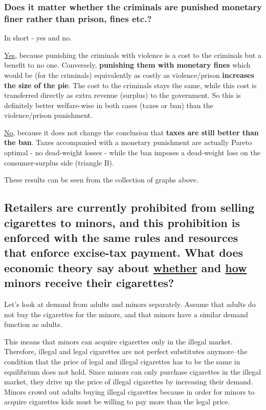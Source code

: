 \documentclass{article}
\begin{document}
\subsubsection{Does it matter whether the criminals are punished
  monetary finer rather than prison, fines etc.?}

In short - yes and no.

\underline{Yes}, because punishing the criminals with violence is a
cost to the criminals but a benefit to no one. Conversely,
\textbf{punishing them with monetary fines} which would be (for the
criminals) equivalently as costly as violence/prison \textbf{increases
  the size of the pie}. The cost to the criminals stays the same,
while this cost is transferred directly as extra revenue (surplus) to
the government. So this is definitely better welfare-wise in both
cases (taxes or ban) than the violence/prison punishment.

\underline{No}, because it does not change the conclusion that
\textbf{taxes are still better than the ban}. Taxes accompanied with a
monetary punishment are actually Pareto optimal - no dead-weight losses
- while the ban imposes a dead-weight loss on the consumer-surplus side
(triangle B).

These results can be seen from the collection of graphs above.



\subsection{Retailers are currently prohibited from selling cigarettes
  to minors, and this prohibition is enforced with the same rules and
  resources that enforce excise-tax payment. What does economic theory
  say about \underline{whether} and \underline{how} minors receive
  their cigarettes?}

Let's look at demand from adults and minors separately. Assume that
adults do not buy the cigarettes for the minors, and that minors have
a similar demand function as adults.

This means that minors can acquire cigarettes only in the illegal
market. Therefore, illegal and legal cigarettes are not perfect
substitutes anymore--the condition that the price of legal and illegal
cigarettes has to be the same in equilibrium does not hold. Since
minors can only purchase cigarettes in the illegal market, they drive
up the price of illegal cigarettes by increasing their demand. Minors
crowd out adults buying illegal cigarettes because in order for minors
to acquire cigarettes kids must be willing to pay more than the legal
price.
\end{document}
